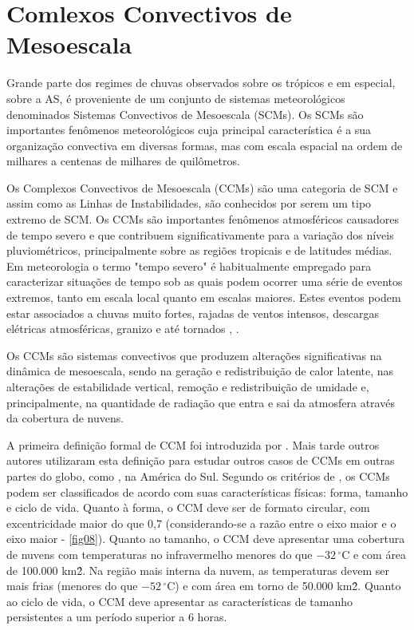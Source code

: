 \section{Comlexos Convectivos de Mesoescala}
\label{ss:ccm}

Grande parte dos regimes de chuvas observados sobre os trópicos e em especial, sobre a AS, é proveniente de um conjunto de sistemas meteorológicos denominados Sistemas Convectivos de Mesoescala (SCMs). Os SCMs são importantes fenômenos meteorológicos cuja principal característica é a sua organização convectiva em diversas formas, mas com escala espacial na ordem de milhares a centenas de milhares de quilômetros.

Os Complexos Convectivos de Mesoescala (CCMs) são uma categoria de SCM e assim como as Linhas de Instabilidades, são conhecidos por serem um tipo extremo de SCM. Os CCMs são importantes fenômenos atmosféricos causadores de tempo severo e que contribuem significativamente para a variação dos níveis pluviométricos, principalmente sobre as regiões tropicais e de latitudes médias. Em meteorologia o termo "tempo severo" é habitualmente empregado para caracterizar situações de tempo sob as quais podem ocorrer uma série de eventos extremos, tanto em escala local quanto em escalas maiores. Estes eventos podem estar associados a chuvas muito fortes, rajadas de ventos intensos, descargas elétricas atmosféricas, granizo e até tornados \cite{maddox80}, \cite{menezessilvadias04}.

Os CCMs são sistemas convectivos que produzem alterações significativas na dinâmica de mesoescala, sendo na geração e redistribuição de calor latente, nas alterações de estabilidade vertical, remoção e redistribuição de umidade e, principalmente, na quantidade de radiação que entra e sai da atmosfera através da cobertura de nuvens.

A primeira definição formal de CCM foi introduzida por \cite{maddox80}. Mais tarde outros autores utilizaram esta definição para estudar outros casos de CCMs em outras partes do globo, como \cite{velascofritsch87}, na América do Sul. Segundo os critérios de \cite{maddox80}, os CCMs podem ser classificados de acordo com suas características físicas: forma, tamanho e ciclo de vida. Quanto à forma, o CCM deve ser de formato circular, com excentricidade maior do que 0,7 (considerando-se a razão entre o eixo maior e o eixo maior - \autoref{fig08}). Quanto ao tamanho, o CCM deve apresentar uma cobertura de nuvens com temperaturas no infravermelho menores do que $-32\,^{\circ}\mathrm{C}$ e com área de 100.000 km\^{2}. Na região mais interna da nuvem, as temperaturas devem ser mais frias (menores do que $-52\,^{\circ}\mathrm{C}$) e com área em torno de 50.000 km\^{2}. Quanto ao ciclo de vida, o CCM deve apresentar as características de tamanho persistentes a um período superior a 6 horas.

